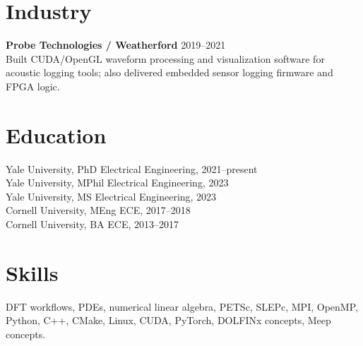 \documentclass[10pt]{article}
\begin{document}
\section{Industry}
\textbf{Probe Technologies / Weatherford} \hfill 2019--2021\\
Built CUDA/OpenGL waveform processing and visualization software for acoustic
logging tools; also delivered embedded sensor logging firmware and FPGA logic.
\section{Education}
Yale University, PhD Electrical Engineering, 2021--present\\
Yale University, MPhil Electrical Engineering, 2023\\
Yale University, MS Electrical Engineering, 2023\\
Cornell University, MEng ECE, 2017--2018\\
Cornell University, BA ECE, 2013--2017
\section{Skills}
DFT workflows, PDEs, numerical linear algebra, PETSc, SLEPc, MPI, OpenMP,
Python, C++, CMake, Linux, CUDA, PyTorch, DOLFINx concepts, Meep concepts.
\end{document}
